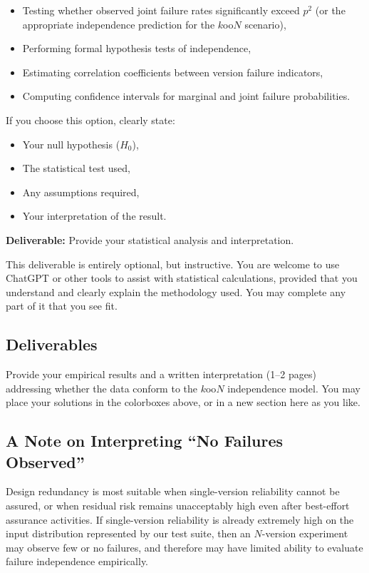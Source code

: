 \begin{itemize}
  \item Testing whether observed joint failure rates significantly exceed $p^2$ (or the appropriate independence prediction for the $k$oo$N$ scenario),
  \item Performing formal hypothesis tests of independence,
  \item Estimating correlation coefficients between version failure indicators,
  \item Computing confidence intervals for marginal and joint failure probabilities.
\end{itemize}

If you choose this option, clearly state:

\begin{itemize}
  \item Your null hypothesis ($H_0$),
  \item The statistical test used,
  \item Any assumptions required,
  \item Your interpretation of the result.
\end{itemize}

\begin{tcolorbox}[colback=yellow!10,colframe=black,boxrule=0.5pt]
\textbf{Deliverable:} Provide your statistical analysis and interpretation.
\end{tcolorbox}

This deliverable is entirely optional, but instructive.
You are welcome to use ChatGPT or other tools to assist with statistical calculations, provided that you understand and clearly explain the methodology used.
You may complete any part of it that you see fit.

\subsection{Deliverables}

Provide your empirical results and a written interpretation (1–2 pages) addressing whether the data conform to the $k$oo$N$ independence model.
You may place your solutions in the colorboxes above, or in a new section here as you like.

\subsection{A Note on Interpreting ``No Failures Observed''}

Design redundancy is most suitable when single-version reliability cannot be assured, or when residual risk remains unacceptably high even after best-effort assurance activities.
If single-version reliability is already extremely high on the input distribution represented by our test suite, then an $N$-version experiment may observe few or no failures, and therefore may have limited ability to evaluate failure independence empirically.

